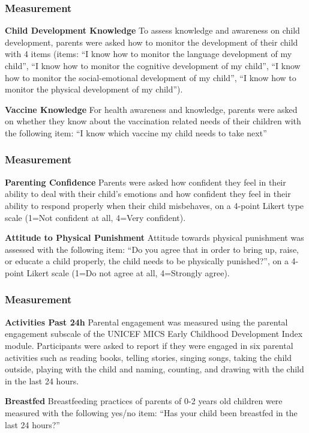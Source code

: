\documentclass[aspectratio=169]{beamer}
\begin{document}
\begin{frame}
  \frametitle{Measurement}

\textbf{Child Development Knowledge}
To assess knowledge and awareness on child development, parents were asked how to monitor the development of their child with 4 items (items: “I know how to monitor the language development of my child”, “I know how to monitor the cognitive development of my child”, “I know how to monitor the social-emotional development of my child”, “I know how to monitor the physical development of my child”).

\textbf{Vaccine Knowledge}
For health awareness and knowledge, parents were asked on whether they know about the vaccination related needs of their children with the following item: “I know which vaccine my child needs to take next” 

\end{frame}


\begin{frame}
  \frametitle{Measurement}

\textbf{Parenting Confidence}
Parents were asked how confident they feel in their ability to deal with their child’s emotions and how confident they feel in their ability to respond properly when their child misbehaves, on a 4-point Likert type scale (1=Not confident at all, 4=Very confident).  

\textbf{Attitude to Physical Punishment}
Attitude towards physical punishment was assessed with the following item: “Do you agree that in order to bring up, raise, or educate a child properly, the child needs to be physically punished?”, on a 4-point Likert scale (1=Do not agree at all, 4=Strongly agree).  


\end{frame}


\begin{frame}
  \frametitle{Measurement}

\textbf{Activities Past 24h}
Parental engagement was measured using the parental engagement subscale of the UNICEF MICS Early Childhood Development Index module. Participants were asked to report if they were engaged in six parental activities such as reading books, telling stories, singing songs, taking the child outside, playing with the child and naming, counting, and drawing with the child in the last 24 hours. 

\textbf{Breastfed}
Breastfeeding practices of parents of 0-2 years old children were measured with the following yes/no item: “Has your child been breastfed in the last 24 hours?”   

\end{frame}
\end{document}
